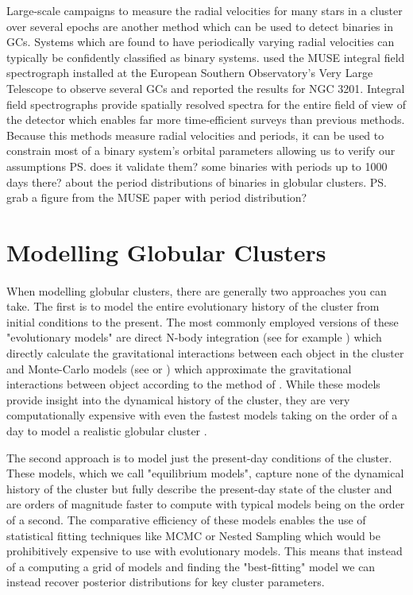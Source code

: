 Large-scale campaigns to measure the radial velocities for many stars in a cluster over several
epochs are another method which can be used to detect binaries in GCs. Systems which are found to
have periodically varying radial velocities can typically be confidently classified as binary
systems. \citet{Giesers2019} used the MUSE integral field spectrograph installed at the European
Southern Observatory's Very Large Telescope to observe several GCs and reported the results for NGC
3201. Integral field spectrographs provide spatially resolved spectra for the entire field of view
of the detector which enables far more time-efficient surveys than previous methods. Because this
methods measure radial velocities and periods, it can be used to constrain most of a binary system's
orbital parameters allowing us to verify our assumptions \ps{does it validate them? some binaries
	with periods up to 1000 days there?} about the period distributions of binaries in globular
clusters. \ps{grab a figure from the MUSE paper with period distribution?}



\section{Modelling Globular Clusters}

\paragraph{}
When modelling globular clusters, there are generally two approaches you can take. The first is to
model the entire evolutionary history of the cluster from initial conditions to the present. The
most commonly employed versions of these "evolutionary models" are direct N-body integration (see
for example \citet{Baumgardt2017a}) which directly calculate the gravitational interactions between
each object in the cluster and Monte-Carlo models (see \citet{Rodriguez2021} or \cite{Hypki2013})
which approximate the gravitational interactions between object according to the method of
\citet{Henon1971}. While these models provide insight into the dynamical history of the cluster,
they are very computationally expensive with even the fastest models taking on the order of a day
to model a realistic globular cluster \citep{Rodriguez2021}.

The second approach is to model just the present-day conditions of the cluster. These models, which
we call "equilibrium models", capture none of the dynamical history of the cluster but fully
describe the present-day state of the cluster and are orders of magnitude faster to compute with
typical models being on the order of a second. The comparative efficiency of these models enables
the use of statistical fitting techniques like MCMC or Nested Sampling which would be prohibitively
expensive to use with evolutionary models. This means that instead of a computing a grid of models
and finding the "best-fitting" model we can instead recover posterior distributions for key cluster
parameters.

